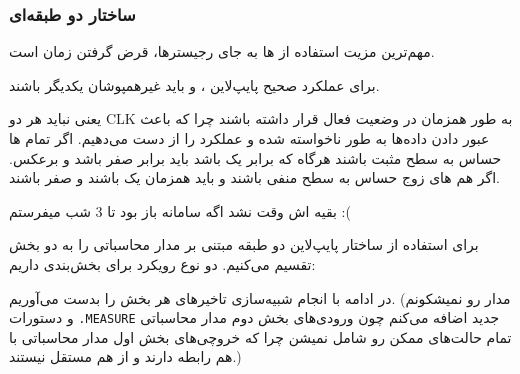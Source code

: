 \subsubsection{ساختار دو طبقه‌ای}


مهم‌ترین مزیت استفاده از ها به جای رجیسترها، قرض گرفتن زمان  است.

برای عملکرد صحیح پایپ‌لاین ،  و 
باید غیرهمپوشان  یکدیگر باشند.

یعنی نباید هر دو CLK به طور همزمان در وضعیت فعال  قرار داشته باشند چرا که باعث عبور دادن داده‌ها به طور نا‌خواسته شده و عملکرد را از دست می‌دهیم.
اگر تمام ها حساس به سطح مثبت باشند هرگاه که  برابر یک باشد  باید برابر صفر باشد و برعکس.
اگر هم های زوج حساس به سطح منفی باشند  و  باید همزمان یک باشند و صفر باشند.


بقیه اش وقت نشد اگه سامانه باز بود تا 3 شب میفرستم :(

برای استفاده از ساختار پایپ‌لاین دو طبقه مبتنی بر  مدار محاسباتی را به دو بخش تقسیم می‌کنیم.
دو نوع رویکرد برای بخش‌بندی داریم:


در ادامه با انجام شبیه‌سازی تاخیر‌های هر بخش را بدست می‌آوریم. (مدار رو نمیشکونم و دستورات \texttt{.MEASURE} جدید اضافه می‌کنم چون ورودی‌های بخش دوم مدار محاسباتی تمام حالت‌های ممکن رو شامل نمیشن چرا که خروچی‌های بخش اول مدار محاسباتی با هم رابطه دارند و از هم مستقل نیستند.)

\newpage


